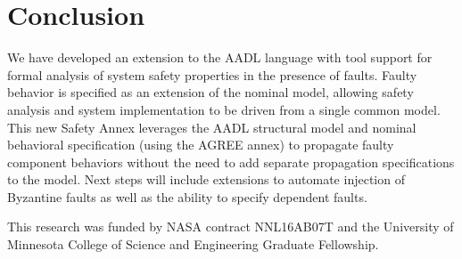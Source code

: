 \section{Conclusion}

We have developed an extension to the AADL language with tool support for formal analysis of system safety properties in the presence of faults. Faulty behavior is specified as an extension of the nominal model, allowing safety analysis and system implementation to be driven from a single common model. This new Safety Annex leverages the AADL structural model and nominal behavioral specification (using the AGREE annex) to propagate faulty component behaviors without the need to add separate propagation specifications to the model.   Next steps will include extensions to automate injection of Byzantine faults as well as the ability to specify dependent faults.  

\vspace{2 mm}
 This research was funded by NASA contract NNL16AB07T and the University of Minnesota College of Science and Engineering Graduate Fellowship.


